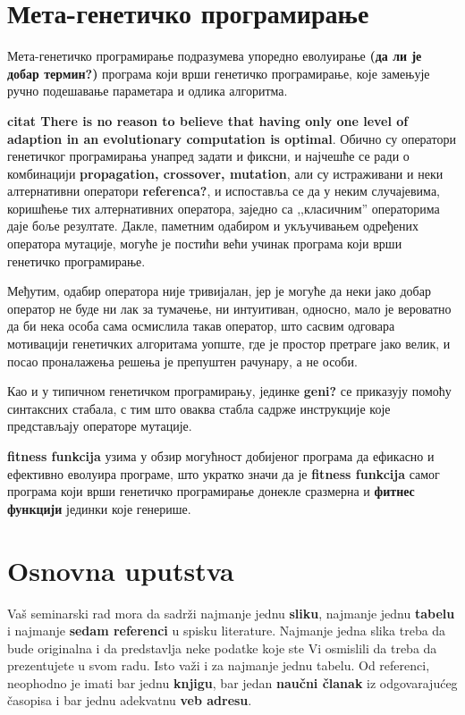 \documentclass[a4paper]{article}
\begin{document}
\section{Мета-генетичко програмирање}

Мета-генетичко програмирање подразумева упоредно еволуирање \textbf{(да ли је добар термин?)} програма који врши генетичко програмирање, које замењује ручно подешавање параметара и одлика алгоритма. 
\linebreak

\textbf{citat There is no reason to believe that having only one level of adaption in an evolutionary computation is optimal}. Обично су оператори генетичког програмирања унапред задати и фиксни, и најчешће се ради о комбинацији \textbf{propagation, crossover, mutation}, али су истраживани и неки алтернативни оператори \textbf{referenca?}, и испоставља се да у неким случајевима, коришћење тих алтернативних оператора, заједно са ,,класичним'' операторима даје боље резултате. Дакле, паметним одабиром и укључивањем одређених оператора мутације, могуће је постићи већи учинак програма који врши генетичко програмирање.
\linebreak

Међутим, одабир оператора није тривијалан, јер је могуће да неки јако добар оператор не буде ни лак за тумачење, ни интуитиван, односно, мало је вероватно да би нека особа сама осмислила такав оператор, што сасвим одговара мотивацији генетичких алгоритама уопште, где је простор претраге јако велик, и посао проналажења решења је препуштен рачунару, а не особи.
\linebreak

Као и у типичном генетичком програмирању, јединке \textbf{geni?} се приказују помоћу синтаксних стабала, с тим што оваква стабла садрже инструкције које представљају операторе мутације.
\linebreak

\textbf{fitness funkcija} узима у обзир могућност добијеног програма да ефикасно и ефективно еволуира програме, што укратко значи да је \textbf{fitness funkcija} самог програма који врши генетичко програмирање донекле сразмерна и \textbf{фитнес функцији} јединки које генерише.

\section{Osnovna uputstva}
Vaš seminarski rad mora da sadrži najmanje jednu \textbf{sliku}, najmanje jednu \textbf{tabelu} i najmanje \textbf{sedam referenci} u spisku literature. Najmanje jedna slika treba da bude originalna i da predstavlja neke podatke koje ste Vi osmislili da treba da prezentujete u svom radu. Isto važi i za najmanje jednu tabelu. 	Od referenci, neophodno je imati bar jednu \textbf{knjigu}, bar jedan \textbf{naučni članak} iz odgovarajućeg časopisa i bar jednu adekvatnu \textbf{veb adresu}. 
\end{document}
